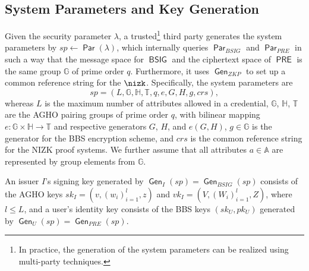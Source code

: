 \documentclass[runningheads]{llncs}
\newcommand{\Z}{\mathbb{Z}}
\DeclareMathOperator{\BSIG}{\ensuremath{\mathsf{BSIG}}}
\DeclareMathOperator{\PRE}{\ensuremath{\mathsf{PRE}}}
\DeclareMathOperator{\COM}{\ensuremath{\mathsf{COM}}}
\DeclareMathOperator{\param}{\mathsf{Par}}
\DeclareMathOperator{\gen}{\mathsf{Gen}}
\begin{document}
\subsection{System Parameters and Key Generation}
Given the security parameter $\lambda$, a trusted\footnote{
In practice, the generation of the system parameters can be realized using multi-party techniques.
}
third party generates  the system parameters by $sp\leftarrow\param(\lambda)$,
which internally queries $\param_{BSIG}$ and  $\param_{PRE}$ %
in such a way that the message space for $\BSIG$ and  the ciphertext space of $\PRE$ is the same group $\mathbb G$ of prime order $q$.
Furthermore, it uses $\gen_{ZKP}$ to set up a common reference string for the $\nizk$.
Specifically, the system parameters are 
\[
sp=\left(L, \mathbb G,\mathbb H,\mathbb T, q, e, G, H, g, crs\right),
\] 
whereas $L$ is the maximum number of attributes allowed in a credential,
$\mathbb G$, $\mathbb H$, $\mathbb T$ are the AGHO pairing groups of prime order $q$, with bilinear mapping $e: \mathbb G\times \mathbb H\longrightarrow \mathbb T$  and respective generators $G$, $H$, and $e(G,H)$, $g\in \mathbb G$ is the generator for the BBS encryption scheme, 
and $crs$ is the common reference string for the NIZK proof systems.
We further assume that all attributes $a\in\mathbb A$ are represented by group elements from $\mathbb G$.

An issuer $I$'s signing key generated by $\gen_I(sp)=\gen_{BSIG}(sp)$ consists of the AGHO keys $sk_I=(v, (w_i)_{i=1}^l, z)$ and $vk_I=(V,(W_i)_{i=1}^l, Z)$, where $l\leq L$, 
and  a user's identity key consists of the BBS keys $(sk_U,pk_U)$ generated by $\gen_U(sp)=\gen_{PRE}(sp)$.
\end{document}
